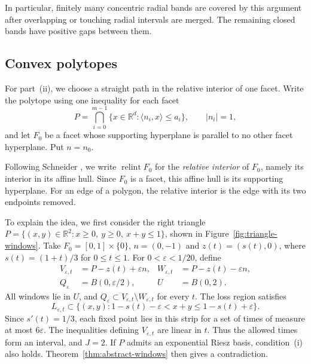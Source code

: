 \documentclass[12pt,reqno,tbtags]{amsart}
\def\R{\mathbb{R}}
\newcommand\inpro[2]{\langle #1,#2\rangle}
\newcommand\1{\mathbbm{1}}
\newcommand{\eps}{\varepsilon}
\begin{document}
In particular, finitely many concentric radial bands are covered by this
argument after overlapping or touching radial intervals are merged.
The remaining closed bands have positive gaps between them.

\subsection{Convex polytopes}

For part~(ii), we choose a straight path in the relative interior of one
facet. Write the polytope using one inequality for each facet
\begin{equation*}
    P=\bigcap_{i=0}^{m-1}\{x\in\R^d:\inpro{n_i}{x}\le a_i\},
    \qquad |n_i|=1,
\end{equation*}
and let $F_0$ be a facet whose supporting hyperplane is parallel to no other
facet hyperplane. Put $n=n_0$.

Following Schneider \cite{Sch14}, we write
$\operatorname{relint}F_0$ for the \emph{relative interior} of $F_0$,
namely its interior in its affine hull. Since $F_0$ is a facet, this affine
hull is its supporting hyperplane. For an edge of a polygon, the relative
interior is the edge with its two endpoints removed.

To explain the idea, we first consider the right triangle
$P=\{(x,y)\in\R^2:x\ge0,\ y\ge0,\ x+y\le1\}$,
shown in Figure~\ref{fig:triangle-windows}.
Take $F_0=[0,1]\times\{0\}$, $n=(0,-1)$ and
$z(t)=(s(t),0)$, where $s(t)=(1+t)/3$ for $0\le t\le1$.
For $0<\eps<1/20$, define
\begin{equation*}
    \begin{aligned}
        V_{\eps,t}&=P-z(t)+\eps n,
        &W_{\eps,t}&=P-z(t)-\eps n,\\
        Q_\eps&=B(0,\eps/2),
        &U&=B(0,2).
    \end{aligned}
\end{equation*}
All windows lie in $U$, and $Q_\eps\subset V_{\eps,t}\setminus W_{\eps,t}$
for every $t$. The loss region satisfies
\begin{equation*}
    L_{\eps,t}\subset
    \{(x,y):1-s(t)-\eps<x+y\le1-s(t)+\eps\}.
\end{equation*}
Since $s'(t)=1/3$, each fixed point lies in this strip for a set of times
of measure at most $6\eps$.
The inequalities defining $V_{\eps,t}$ are linear in $t$.
Thus the allowed times form an interval, and $J=2$.
If $P$ admits an exponential Riesz basis, condition~(i) also holds.
Theorem~\ref{thm:abstract-windows} then gives a contradiction.
\end{document}
